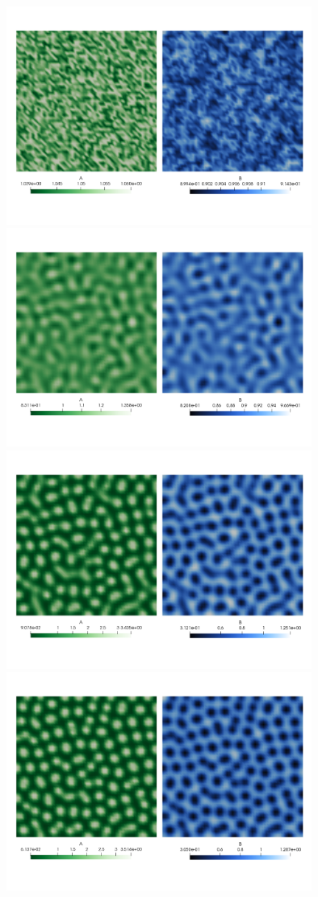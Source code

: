 \begin{center}
\includegraphics[width=10cm]{python_codes/fieldstone_130/results/AB_000}
\includegraphics[width=10cm]{python_codes/fieldstone_130/results/AB_200}
\includegraphics[width=10cm]{python_codes/fieldstone_130/results/AB_400}
\includegraphics[width=10cm]{python_codes/fieldstone_130/results/AB_600}

\end{center}
